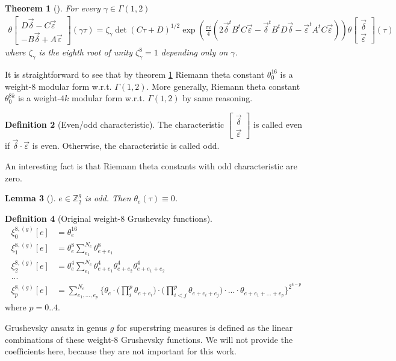 \documentclass{article}
\newcommand{\ZZ}{\mathbb{Z}}
\newcommand{\ch}[2]{\left[\begin{array}{c}#1\\ #2 \end{array}\right]}
\newcommand{\de}{\delta}
\newcommand{\ep}{\varepsilon}
\newcommand{\br}[1]{\left(#1\right)}
\theoremstyle{plain}
\newtheorem{theorem}{Theorem}[section]
\newtheorem{lemma}[theorem]{Lemma}
\theoremstyle{definition}
\newtheorem{definition}[theorem]{Definition}
\begin{document}
\begin{theorem}[\cite{mumford-theta}]\label{thm:theta-modularity}
    For every $\gamma \in \Gamma(1, 2)$
        \begin{align}
            \theta\ch{D{\vec{\de}}-C{\vec{\ep}}}{-B{\vec{\de}}+A{\vec{\ep}}}\br{\gamma\tau} = 
            \zeta_{\gamma} \det\br{C\tau+D}^{1/2}
            \exp\br{\frac{\pi i}{4}\br{{2{\vec{\de}}^t B^tC{\vec{\ep}}-{\vec{\de}}^t
            B^tD{\vec{\de}}-{\vec{\ep}}^t A^tC{\vec{\ep}}}}}
            \theta\ch{{\vec{\de}}}{{\vec{\ep}}}\br{\tau}
        \end{align}
    where $\zeta_\gamma$ is the eighth root of unity $\zeta_\gamma^8=1$ depending only on $\gamma$.
\end{theorem}

It is straightforward to see that by theorem \ref{thm:theta-modularity} 
Riemann theta constant $\theta_0^{16}$ is a weight-8 modular form w.r.t. $\Gamma(1,2)$.
More generally, Riemann theta constant $\theta_0^{8k}$ is a 
weight-$4k$ modular form w.r.t. $\Gamma(1,2)$ by same reasoning.

\begin{definition}[Even/odd characteristic]
    The characteristic $\ch {{\vec{\de}}}{{\vec{\ep}}}$ is called even if ${\vec{\de}} \cdot {\vec{\ep}}$ is even. 
    Otherwise, the characteristic is called odd.
\end{definition}

An interesting fact is that Riemann theta constants with odd characteristic are zero.
\begin{lemma}[\cite{mumford-theta}]
    $e \in \ZZ_2^g$ is odd. Then $\theta_e (\tau) \equiv 0$.
\end{lemma}

\begin{definition}[Original weight-8 Grushevsky functions]
    \begin{align}
        \xi_0^{8, (g)}[e] &= \theta^{16}_e \\
        \xi_1^{8, (g)}[e] &= \theta^{8}_e \sum_{e_1}^{N_e} \theta^8_{e+e_1} \\
        \xi_2^{8, (g)}[e] &= \theta^{4}_e \sum_{e_1}^{N_e} \theta^4_{e+e_1}\theta^4_{e+e_2}\theta^4_{e+e_1+e_2} \\
        ... \nonumber \\
        \xi_p^{8, (g)}[e] &= \sum_{e_1, ..., e_p}^{N_e} \Bigg \{
            \theta_e 
            \cdot \Big( \prod_i^p \theta_{e + e_i} \Big)
            \cdot \Big( \prod_{i < j}^p \theta_{e + e_i + e_j} \Big)
            \cdot ...
            \cdot \theta_{e + e_1 + ... + e_p}
        \Bigg \} ^ {2^{4 - p}}
    \end{align}
    where $p=0..4$.
\end{definition}
Grushevsky ansatz in genus $g$ for superstring measures is defined as the linear combinations 
    of these weight-8 Grushevsky functions.
    We will not provide the coefficients here, because they are not important for this work.
\end{document}
